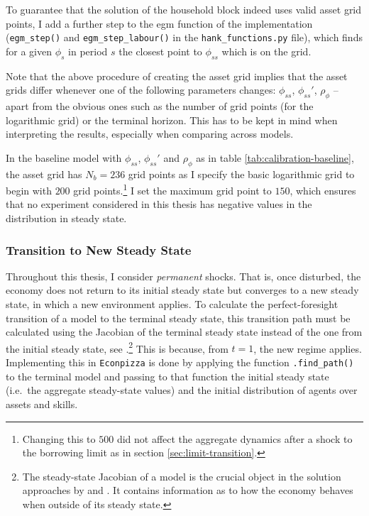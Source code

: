 \documentclass[a4paper,12pt]{article} %
\numberwithin{equation}{section} %
\numberwithin{figure}{section}
\numberwithin{table}{section}
\begin{document}
\begin{refsection}
\begin{appendices}
To guarantee that the solution of the household block indeed uses valid asset grid points, I add a further step to the \Gls{egm} function of the implementation (\texttt{egm\_step()} and \texttt{egm\_step\_labour()} in the \texttt{hank\_functions.py} file), which finds for a given $\phi_s$ in period $s$ the closest point to $\phi_{ss}$ which is on the grid.

Note that the above procedure of creating the asset grid implies that the asset grids differ whenever one of the following parameters changes: $\phi_{ss}$, $\phi_{ss}'$, $\rho_{\phi}$ -- apart from the obvious ones such as the number of grid points (for the logarithmic grid) or the terminal horizon. This has to be kept in mind when interpreting the results, especially when comparing across models. 

In the baseline model with $\phi_{ss}$, $\phi_{ss}'$ and $\rho_{\phi}$ as in table \ref{tab:calibration-baseline}, the asset grid has $N_b = 236$ grid points as I specify the basic logarithmic grid to begin with $200$ grid points.\footnote{Changing this to $500$ did not affect the aggregate dynamics after a shock to the borrowing limit as in section \ref{sec:limit-transition}.} I set the maximum grid point to $150$, which ensures that no experiment considered in this thesis has negative values in the distribution in steady state.

\subsubsection*{Transition to New Steady State}

Throughout this thesis, I consider \textit{permanent} shocks. That is, once disturbed, the economy does not return to its initial steady state but converges to a new steady state, in which a new environment applies. To calculate the perfect-foresight transition of a model to the terminal steady state, this transition path must be calculated using the Jacobian of the terminal steady state instead of the one from the initial steady state, see \textcite{auclert2021}.\footnote{The steady-state Jacobian of a model is the crucial object in the solution approaches by \textcite{auclert2021} and \textcite{boehl2023econpizza}. It contains information as to how the economy behaves when outside of its steady state.} This is because, from $t=1$, the new regime applies. Implementing this in \texttt{Econpizza} is done by applying the function \texttt{.find\_path()} to the terminal model and passing to that function the initial steady state (i.e.~the aggregate steady-state values) and the initial distribution of agents over assets and skills.


\end{appendices}
\end{refsection}
\end{document}
